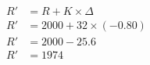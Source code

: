 \documentclass[preview]{standalone}
\begin{document}
\begin{align*}
R' &= R + K \times \Delta \\ R' &= 2000 + 32 \times (-0.80) \\ R' &= 2000 - 25.6 \\ R' &= 1974
\end{align*}
\end{document}
